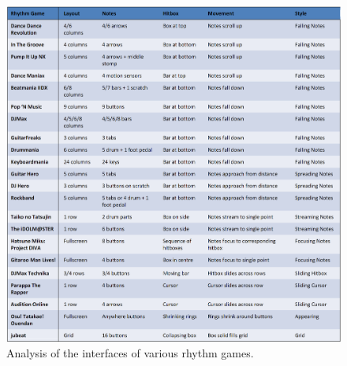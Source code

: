 \documentclass{sig-alternate}
\begin{document}
\begin{figure}[htb!]
	\begin{center}
		\includegraphics[width=1\linewidth]{figure_interface_analysis}
	\end{center}
	\vspace{-12pt}
	\caption{Analysis of the interfaces of various rhythm games.}
	\label{fig:interface_analysis}
\end{figure}
\end{document}
